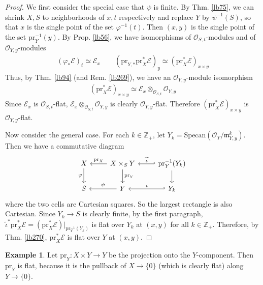 \documentclass[12pt,b5paper,notitlepage]{report}
\theoremstyle{definition}
\newtheorem{eg}[df]{Example}
\theoremstyle{plain}
\newcommand{\fk}{\mathfrak}
\newcommand{\wtd}{\widetilde}
\newcommand{\scr}{\mathscr}
\newcommand{\Zbb}{\mathbb Z}
\newcommand{\pr}{\mathrm {pr}}
\newcommand{\Specan}{\mathrm{Specan}}
\numberwithin{equation}{section}
\begin{document}
\begin{proof}
We first consider the special case that $\psi$ is finite. By Thm. \ref{lb75}, we can shrink $X,S$ to neighborhoods of $x,t$ respectively and replace $Y$ by $\psi^{-1}(S)$, so that $x$ is the single point of the set $\varphi^{-1}(t)$. Then $(x,y)$ is the single point of the set $\pr_Y^{-1}(y)$. By Prop. \ref{lb56}, we have isomorphisms of $\scr O_{S,t}$-modules and of $\scr O_{Y,y}$-modules
\begin{align*}
(\varphi_*\scr E)_t\simeq\scr E_x\qquad (\pr_{Y,*}\pr_X^*\scr E)_y\simeq (\pr_X^*\scr E)_{x\times y}
\end{align*}
Thus, by Thm. \ref{lb94} (and Rem. \ref{lb269}), we have an $\scr O_{Y,y}$-module isomorphism
\begin{align*}
(\pr_X^*\scr E)_{x\times y}\simeq \scr E_x\otimes_{\scr O_{S,t}}\scr O_{Y,y}
\end{align*}
Since $\scr E_x$ is $\scr O_{S,t}$-flat, $\scr E_x\otimes_{\scr O_{S,t}}\scr O_{Y,y}$ is clearly $\scr O_{Y,y}$-flat. Therefore $(\pr_X^*\scr E)_{x\times y}$ is $\scr O_{Y,y}$-flat.

Now consider the general case. For each $k\in\Zbb_+$, let $Y_k=\Specan(\scr O_Y/\fk m_{Y,y}^k)$. Then we have a commutative diagram
\begin{equation*}
\begin{tikzcd}
X \arrow[d, "\varphi"'] & X\times_SY \arrow[d, "\pr_Y"] \arrow[l, "\pr_X"']  & \pr_Y^{-1}(Y_k) \arrow[d] \arrow[l, hook',"\wtd\iota"']\\
S                       & Y \arrow[l, "\psi"']    & Y_k \arrow[l,hook', "\iota"']                         
\end{tikzcd}
\end{equation*}
where the two cells are Cartesian squares. So the largest rectangle is also Cartesian. Since $Y_k\rightarrow S$ is clearly finite, by the first paragraph, $\wtd\iota^*\pr_X^*\scr E=(\pr_X^*\scr E)|_{\pr_Y^{-1}(Y_k)}$ is flat over $Y_k$ at $(x,y)$ for all $k\in\Zbb_+$. Therefore, by Thm. \ref{lb270}, $\pr_X^*\scr E$ is flat over $Y$ at $(x,y)$.
\end{proof}



\begin{eg}\label{lb278}
Let $\pr_Y:X\times Y\rightarrow Y$ be the projection onto the $Y$-component. Then $\pr_Y$ is flat, because it is the pullback of $X\rightarrow \{0\}$ (which is clearly flat) along $Y\rightarrow\{0\}$.
\end{eg}
\end{document}
